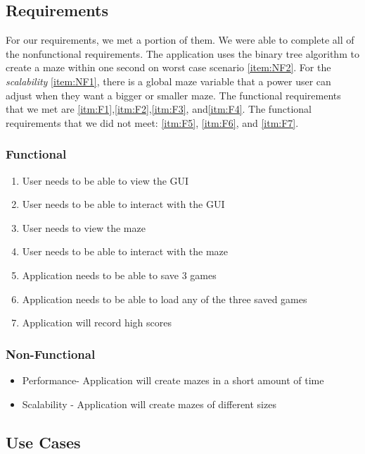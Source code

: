 \documentclass[10pt,conference,onecolumn,compsoc]{IEEEtran}
\begin{document}
\subsection{Requirements}
For our requirements, we met a portion of them. We were able to complete all of the nonfunctional requirements. The application uses the binary tree algorithm to create a maze within one second on worst case scenario \ref{item:NF2}. For the \textit{scalability} \ref{item:NF1}, there is a global maze variable that a power user can adjust when they want a bigger or smaller maze. The functional requirements that we met are \ref{itm:F1},\ref{itm:F2},\ref{itm:F3}, and\ref{itm:F4}. The functional requirements that we did not meet: \ref{itm:F5}, \ref{itm:F6}, and \ref{itm:F7}. 
\subsubsection{Functional}
\begin{enumerate}
\item User needs to be able to view the GUI\label{itm:F1} 
\item User needs to be able to interact with the GUI\label{itm:F2} 
\item User needs to view the maze\label{itm:F3} 
\item User needs to be able to interact with the maze\label{itm:F4} 
\item Application needs to be able to save 3 games\label{itm:F5} 
\item Application needs to be able to load any of the three saved games \label{itm:F6}
\item Application will record high scores \label{itm:F7}
\end{enumerate}

\subsubsection{Non-Functional}
\begin{itemize}
\item Performance- Application will create mazes in a short amount of time\label{item:NF2} 
\item Scalability - Application will create mazes of different sizes\label{item:NF1}
\end{itemize}

\subsection{Use Cases}
\end{document}
